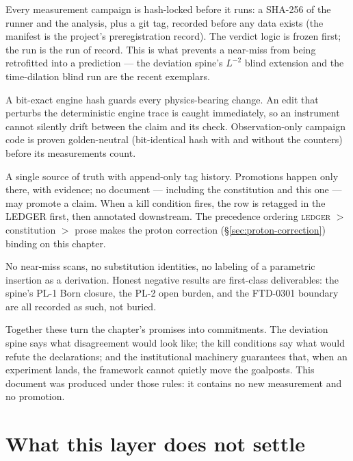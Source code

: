 \begin{description}[leftmargin=0pt,itemsep=4pt,topsep=2pt,font=\normalfont\itshape]
  \item[Pre-registration.] Every measurement campaign is hash-locked before it
  runs: a SHA-256 of the runner and the analysis, plus a git tag, recorded
  before any data exists (the manifest is the project's preregistration record).
  The verdict logic is frozen first; the run is the run of record. This is what
  prevents a near-miss from being retrofitted into a prediction --- the deviation
  spine's $L^{-2}$ blind extension and the time-dilation blind run are the recent
  exemplars.
  \item[The golden-tick gate.] A bit-exact engine hash guards every
  physics-bearing change. An edit that perturbs the deterministic engine trace is
  caught immediately, so an instrument cannot silently drift between the claim and
  its check. Observation-only campaign code is proven golden-neutral (bit-identical
  hash with and without the counters) before its measurements count.
  \item[The LEDGER.] A single source of truth with append-only tag history.
  Promotions happen only there, with evidence; no document --- including the
  constitution and this one --- may promote a claim. When a kill condition fires,
  the row is retagged in the LEDGER first, then annotated downstream. The
  precedence ordering \textsc{ledger} $>$ constitution $>$ prose makes the
   proton correction (\S\ref{sec:proton-correction}) binding on this
  chapter.
  \item[Anti-target discipline.] No near-miss scans, no substitution identities,
  no labeling of a parametric insertion as a derivation. Honest negative results
  are first-class deliverables: the spine's PL-1 Born closure, the PL-2 open
  burden, and the FTD-0301 boundary are all recorded as such, not buried.
\end{description}

\noindent
Together these turn the chapter's promises into commitments. The deviation spine
says what disagreement would look like; the kill conditions say what would refute
the declarations; and the institutional machinery guarantees that, when an
experiment lands, the framework cannot quietly move the goalposts. This document
was produced under those rules: it contains no new measurement and no promotion.

\section{What this layer does not settle}\label{sec:science-open}

